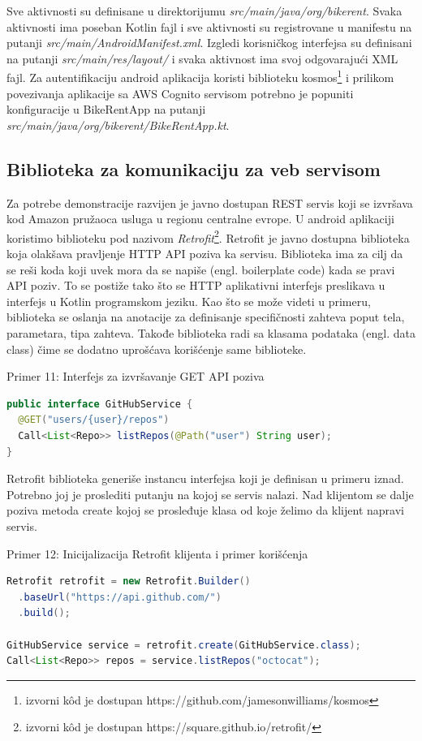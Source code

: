\documentclass[12pt,oneside]{memoir}
\begin{document}
Sve aktivnosti su definisane u direktorijumu \emph{src/main/java/org/bikerent}. Svaka aktivnosti ima poseban Kotlin fajl i sve aktivnosti su registrovane u manifestu na putanji \emph{src/main/AndroidManifest.xml}. Izgledi korisničkog interfejsa su definisani na putanji \emph{src/main/res/layout/} i svaka aktivnost ima svoj odgovarajući XML fajl. Za autentifikaciju android aplikacija koristi biblioteku kosmos\footnote{izvorni kôd je dostupan https://github.com/jamesonwilliams/kosmos} i prilikom povezivanja aplikacije sa AWS Cognito servisom potrebno je popuniti konfiguracije u BikeRentApp na putanji \emph{src/main/java/org/bikerent/BikeRentApp.kt}.
 
\subsection{Biblioteka za komunikaciju za veb servisom}
 
Za potrebe demonstracije razvijen je javno dostupan REST servis koji se izvršava kod Amazon pružaoca usluga u regionu centralne evrope. U android aplikaciji koristimo biblioteku pod nazivom \emph{Retrofit}\footnote{izvorni kôd je dostupan https://square.github.io/retrofit/}. Retrofit je javno dostupna biblioteka koja olakšava pravljenje HTTP API poziva ka servisu. Biblioteka ima za cilj da se reši koda koji uvek mora da se napiše (engl. boilerplate code) kada se pravi API poziv. To se postiže tako što se HTTP aplikativni interfejs preslikava u interfejs u Kotlin programskom jeziku. Kao što se može videti u primeru, biblioteka se oslanja na anotacije za definisanje specifičnosti zahteva poput tela, parametara, tipa zahteva. Takođe biblioteka radi sa klasama podataka (engl. data class) čime se dodatno uprošćava korišćenje same biblioteke.

\begin{center} Primer 11: Interfejs za izvršavanje GET API poziva\end{center}
\begin{lstlisting}[language=Java]
public interface GitHubService {
  @GET("users/{user}/repos")
  Call<List<Repo>> listRepos(@Path("user") String user);
}
\end{lstlisting}


Retrofit biblioteka generiše instancu interfejsa koji je definisan u primeru iznad. Potrebno joj je proslediti putanju na kojoj se servis nalazi. Nad klijentom se dalje poziva metoda create kojoj se prosleđuje klasa od koje želimo da klijent napravi servis.
\begin{center} Primer 12: Inicijalizacija Retrofit klijenta i primer korišćenja\end{center}
\begin{lstlisting}[language=Java]
Retrofit retrofit = new Retrofit.Builder()
  .baseUrl("https://api.github.com/")
  .build();

GitHubService service = retrofit.create(GitHubService.class);
Call<List<Repo>> repos = service.listRepos("octocat");
\end{lstlisting}
\end{document}
